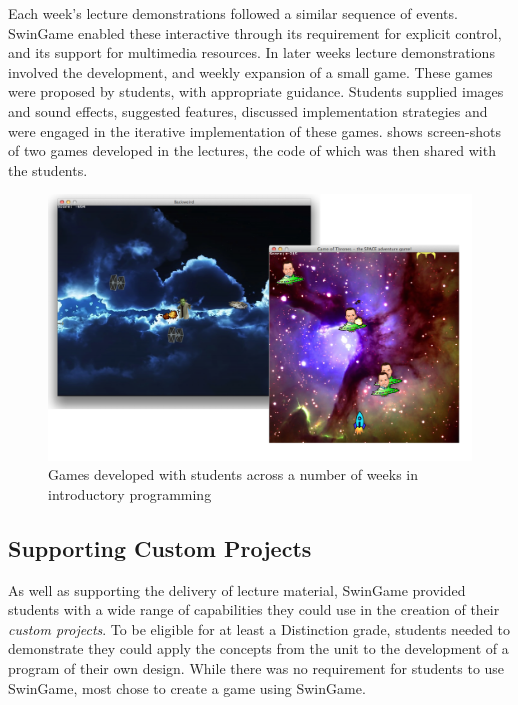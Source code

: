 
Each week's lecture demonstrations followed a similar sequence of events. SwinGame enabled these interactive through its requirement for explicit control, and its support for multimedia resources. In later weeks lecture demonstrations involved the development, and weekly expansion of a small game. These games were proposed by students, with appropriate guidance. Students supplied images and sound effects, suggested features, discussed implementation strategies and were engaged in the iterative implementation of these games.  shows screen-shots of two games developed in the lectures, the code of which was then shared with the students.

\begin{figure}[thbp]
  \centering
  \includegraphics[width=\textwidth]{Games}
  \caption{Games developed with students across a number of weeks in introductory programming}
  \label{fig:games}
\end{figure}


\subsection{Supporting Custom Projects} %
\label{sub:supporting_custom_projects}

As well as supporting the delivery of lecture material, SwinGame provided students with a wide range of capabilities they could use in the creation of their \emph{custom projects}. To be eligible for at least a Distinction grade, students needed to demonstrate they could apply the concepts from the unit to the development of a program of their own design. While there was no requirement for students to use SwinGame, most chose to create a game using SwinGame.

